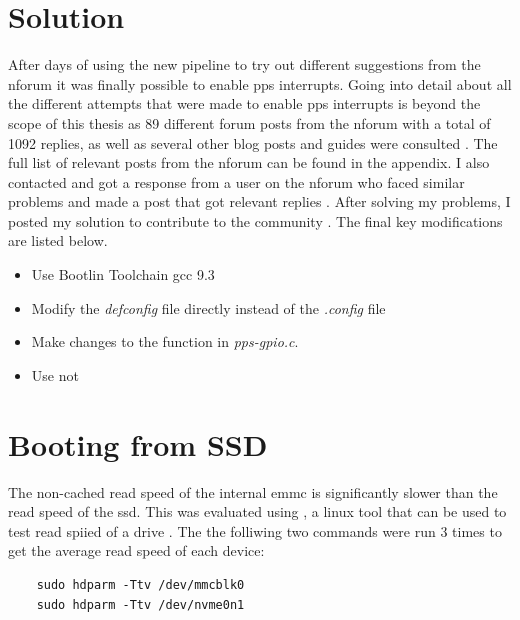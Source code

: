\section{Solution}
After days of using the new pipeline to try out different suggestions from the \gls{nforum} it was finally possible to enable \gls{pps} interrupts.
Going into detail about all the different attempts that were made to enable \gls{pps} interrupts is beyond the scope of this thesis as 89 different forum posts from the \gls{nforum} with a total of 1092 replies, as well as several other blog posts and guides were consulted \cite{nvidiaNVIDIAJetsonLinux2023} \cite{nvidiaNVIDIATEGRALINUX} \cite{nvidiaNVIDIAJetsonLinux} \cite{nulizhuanzhuAGXXavier35} \cite{fishotterprojectEnablePpsSupport}.
The full list of relevant posts from the \gls{nforum} can be found in the appendix.
I also contacted and got a response from a user on the \gls{nforum} who faced similar problems \cite{mhtechdevProgressPPS2023} and made a post that got relevant replies \cite{martensEnablePPSJetson2023}.
After solving my problems, I posted my solution to contribute to the community \cite{martensEnablePPSJetson2023}.
The final key modifications are listed below.
\begin{itemize}
    \item Use Bootlin Toolchain gcc 9.3
    \item Modify the \textit{defconfig} file directly instead of the \textit{.config} file
    \item Make changes to the  function in \textit{pps-gpio.c}.
    \item Use  not 
\end{itemize}





\section{Booting from SSD}
The non-cached read speed of the internal \gls{emmc} is significantly slower than the read speed of the \gls{ssd}.
This was evaluated using , a linux tool that can be used to test read spiied of a drive \cite{lordHdparmLinuxManual2018}.
The the folliwing two commands were run 3 times to get the average read speed of each device:
\begin{verbatim}
    sudo hdparm -Ttv /dev/mmcblk0 
    sudo hdparm -Ttv /dev/nvme0n1 
\end{verbatim}


